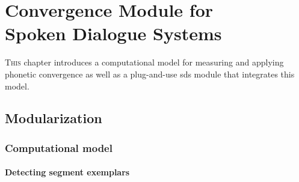 \chapter[Convergence Module for Spoken Dialogue Systems]{Convergence Module for\\Spoken Dialogue Systems}
\label{chap:convergence_module_for_sdss}

\lettrine{T}{his} chapter introduces a computational model for measuring and applying phonetic convergence as well as a plug-and-use \acs{sds} module that integrates this model.

\pagebreak

\section{Modularization}
\label{sec:modularization}


\subsection{Computational model}
\label{subsec:computational_model}




\subsubsection{Detecting segment exemplars}
\label{subsubsec:detecting segment exemplars}

